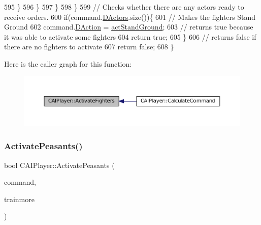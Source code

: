 \begin{DoxyCode}
595                 \}
596             \}
597         \}
598     \}
599     \textcolor{comment}{// Checks whether there are any actors ready to receive orders.}
600     \textcolor{keywordflow}{if}(command.\hyperlink{structSPlayerCommandRequest_aa37fc01519676345703d78b9f573894a}{DActors}.size())\{
601         \textcolor{comment}{// Makes the fighters Stand Ground}
602         command.\hyperlink{structSPlayerCommandRequest_a80897bbccf2c4e0b148a7aa815a926c6}{DAction} = \hyperlink{GameDataTypes_8h_a35b98ce26aca678b03c6f9f76e4778cea60ecb1b155c04190174a46d8053b5a04}{actStandGround};
603         \textcolor{comment}{// returns true because it was able to activate some fighters}
604         \textcolor{keywordflow}{return} \textcolor{keyword}{true};
605     \}
606     \textcolor{comment}{// returns false if there are no fighters to activate}
607     \textcolor{keywordflow}{return} \textcolor{keyword}{false};
608 \}
\end{DoxyCode}
Here is the caller graph for this function\+:\nopagebreak
\begin{figure}[H]
\begin{center}
\leavevmode
\includegraphics[width=350pt]{classCAIPlayer_a4216d7e76315234a4fe22fb3a0a89c1d_icgraph}
\end{center}
\end{figure}
\hypertarget{classCAIPlayer_a3fab1c955fd68bb53fa80bb1872d2819}{}\label{classCAIPlayer_a3fab1c955fd68bb53fa80bb1872d2819} 
\subsubsection{\texorpdfstring{Activate\+Peasants()}{ActivatePeasants()}}
{\footnotesize\ttfamily bool C\+A\+I\+Player\+::\+Activate\+Peasants (\begin{DoxyParamCaption}\item[{\hyperlink{structSPlayerCommandRequest}{S\+Player\+Command\+Request} \&}]{command,  }\item[{bool}]{trainmore }\end{DoxyParamCaption})\hspace{0.3cm}{\ttfamily [protected]}}



